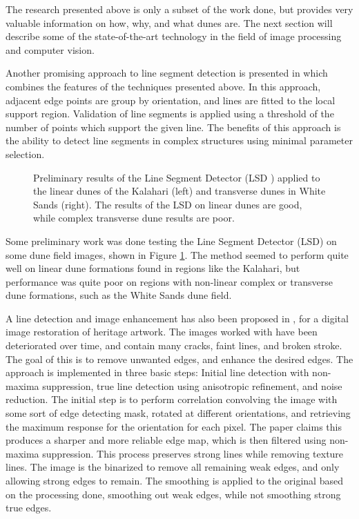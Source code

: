 The research presented above is only a subset of the work done, but provides very valuable information on how, why, and what dunes are. The next section will describe some of the state-of-the-art technology in the field of image processing and computer vision. 

Another promising approach to line segment detection is presented in \cite{2010_lsd_fast_line_segment_detector} which combines the features of the techniques presented above. In this approach, adjacent edge points are group by orientation, and lines are fitted to the local support region. Validation of line segments is applied using a threshold of the number of points which support the given line. The benefits of this approach is the ability to detect line segments in complex structures using minimal parameter selection. 

\begin{figure}
	\centering
	\caption{Preliminary results of the Line Segment Detector (LSD \cite{2010_lsd_fast_line_segment_detector}) applied to the linear dunes of the Kalahari (left) and transverse dunes in White Sands (right). The results of the LSD on linear dunes are good, while complex transverse dune results are poor.}
	\label{fig:lsd_results}
\end{figure}

Some preliminary work was done testing the Line Segment Detector (LSD) on some dune field images, shown in Figure \ref{fig:lsd_results}. The method seemed to perform quite well on linear dune formations found in regions like the Kalahari, but performance was quite poor on regions with non-linear complex or transverse dune formations, such as the White Sands dune field.

A line detection and image enhancement has also been proposed in \cite{Robust_Faint_Line_Detection_Enhancement_Algorithm}, for a digital image restoration of heritage artwork. The images worked with have been deteriorated over time, and contain many cracks, faint lines, and broken stroke. The goal of this is to remove unwanted edges, and enhance the desired edges. The approach is implemented in three basic steps: Initial line detection with non-maxima suppression, true line detection using anisotropic refinement, and noise reduction. The initial step is to perform correlation convolving the image with some sort of edge detecting mask, rotated at different orientations, and retrieving the maximum response for the orientation	for each pixel. The paper claims this produces a sharper and more reliable edge map, which is then filtered using non-maxima suppression. This process preserves strong lines while removing texture lines. The image is the binarized to remove all remaining weak edges, and only allowing strong edges to remain. The smoothing is applied to the original based on the processing done, smoothing out weak edges, while not smoothing strong true edges.

